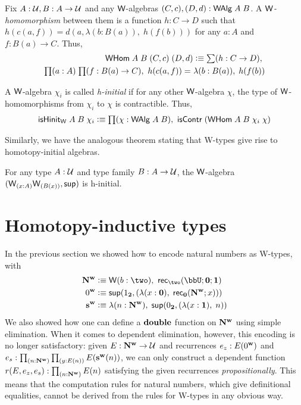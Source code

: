 \begin{defn}
Fix $A : \mathcal{U}, B : A \to \mathcal{U}$ and any $\mathsf{W}$-algebras $(C,c),(D,d) : \mathsf{\mathsf{W} Alg} \; A \; B$. A \emph{$\mathsf{W}$-homomorphism} between them is a function $h : C \to D$ such that $h(c(a,f)) = d(a,\lambda (b : B(a)), \; h(f(b)))$ for any $a : A$ and $f : B(a) \to C$. Thus,
\begin{align*}
\whom \; A \; B \; (C, c) \; (D,d) \defeq \sm {h : C \to D} \\ \prd{a:A}{f:B(a)\to C} \id{h(c(a,f))}{\lambda (b : B(a)), \; h(f(b))}
\end{align*}
\end{defn}

\begin{defn}
A $\mathsf{W}$-algebra $\chi_i$ is called \emph{h-initial} if for any other $\mathsf{W}$-algebra $\chi$, the type of $\mathsf{W}$-homomorphisms from $\chi_i$ to $\chi$ is contractible. Thus,
\begin{align*}
\ishinitw \; A \; B \; \chi_i \defeq \prd{\chi : \walg \; A \; B} \iscontr \; (\whom \; A \; B \; \chi_i\; \chi)
\end{align*}
\end{defn}

Similarly, we have the analogous theorem stating that W-types give rise to homotopy-initial algebras.
\begin{thm}\label{thm:w-hinit}
For any type $A : \mathcal{U}$ and type family $B : A \to \mathcal{U}$, the $\mathsf{W}$-algebra $(\wtype{x:A}{B(x)}, \supp)$ is h-initial.
\end{thm}



\section{Homotopy-inductive types}
\label{sec:htpy-inductive}

In the previous section we showed how to encode natural numbers as W-types, with 
\begin{align*}
\natw & \defeq \wtype{b:\two} \rec\two(\bbU;\zero;\one) \\
\zw & \defeq \supp(\true, (\lambda (x : \zero), \; \rec\zero(\natw;x))) \\
\sw & \defeq \lambda (n : \natw), \; \supp(\false, (\lambda (x : \one), \; n))
\end{align*}
We also showed how one can define a $\mathbf{double}$ function on $\mathbf{N^w}$ using simple elimination. When it comes to dependent elimination, however, this encoding is no longer satisfactory: given $E : \mathbf{N^w} \to \mathcal{U}$ and recurrences $e_z : E(0^\mathbf{w})$ and $e_s : \prd{n : \natw}{y : E(n)} E(\sw(n))$, we can only construct a dependent function $r(E,e_z,e_s) : \prd{n : \natw} E(n)$ satisfying the given recurrences \emph{propositionally}. This means that the computation rules for natural numbers, which give definitional equalities, cannot be derived from the rules for W-types in any obvious way.

